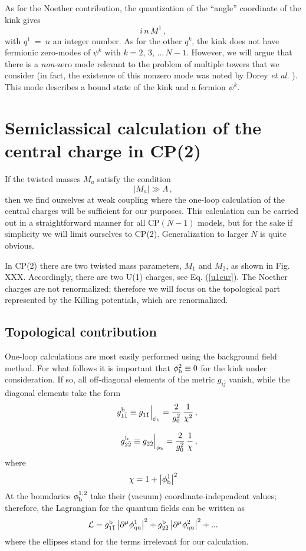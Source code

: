 \documentclass[epsfig,12pt]{article}
\def\beq{\begin{equation}}
\def\eeq{\end{equation}}
\def\beq{\begin{equation}}
\def\eeq{\end{equation}}
\begin{document}
       As for the Noether contribution, the quantization of the ``angle'' coordinate of the kink gives 
\beq
       i\, n\, M^1\,,
\eeq
       with $ q^1 ~=~ n $ an integer number.
       As for the other $ q^k $, the kink does not have fermionic zero-modes of $ \psi^k $ with $ k = 2,\, 3,\, ...\, N-1 $.
       However, we will argue that there is a
       {\it non}-zero mode relevant to the problem of multiple towers that we consider (in fact, 
       the existence of this nonzero mode was noted by Dorey {\it et al.} \cite{Dorey:1999zk}).
       This mode describes a bound state of the kink and a fermion $ \psi^k $. 
     
     \section{Semiclassical calculation of the central charge  in CP(2)}
     \label{semclas}
     
     If the twisted masses $M_a$ satisfy the condition
     \beq
     |M_a|\gg\Lambda\,,
     \eeq
       then we find ourselves at weak coupling where the one-loop calculation of the
       central charges will be sufficient for our purposes. This calculation can be carried out in a straightforward manner for all CP$(N-1)$ models, but for the sake if simplicity we will limit ourselves to CP(2). Generalization to larger $N$ is quite obvious. 
       
In CP(2) there are two twisted mass parameters, $M_1$ and $M_2$, as shown in Fig. XXX.  Accordingly, there are two U(1) charges, see Eq. (\ref{u1cur}). The Noether charges are not renormalized; therefore we will focus on the topological part represented by the Killing potentials, which are renormalized. 

\subsection{Topological contribution}

One-loop calculations are most easily performed using the background field method.
For what follows it is important that $\phi^2_{\rm b}\equiv 0$ for the kink under consideration.
If so, all off-diagonal elements of the metric $g_{i\bar j}$ vanish, while the diagonal elements take the form
\begin{eqnarray}
&&
g_{1\bar 1}^{\rm b} \equiv g_{1\bar 1}\Big|_{\phi_{\rm b}} = \frac{2}{g_0^2}\,\frac {1}{\chi^2}\,,\nonumber\\[3mm]
&&
g_{2\bar 2}^{\rm b} \equiv 
g_{2\bar 2}\Big|_{\phi_{\rm b}} = \frac{2}{g_0^2}\,\frac {1}{\chi}\,,
\end{eqnarray}
where
\beq
\chi = 1 + \left| \phi^1_{\rm b}
\right|^2
\eeq
At the boundaries $\phi_{\rm b}^{1,2}$ take their (vacuum) coordinate-independent values;
therefore, the Lagrangian for the quantum fields can be written as
\beq
\mathcal{L}= g_{1\bar 1}^{\rm b} \left| \partial^\mu \phi^1_{\rm qu}\right|^2+
g_{2\bar 2}^{\rm b} \left| \partial^\mu \phi^2_{\rm qu}\right|^2 + ...
\label{324}
\eeq
where the ellipses stand for the terms irrelevant for our calculation.
\end{document}
